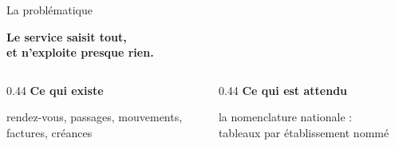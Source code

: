 \documentclass[aspectratio=169,11pt]{beamer}
\begin{document}
\begin{frame}{La problématique}
  \vspace{8mm}
  \begin{center}
    \begin{minipage}{0.84\textwidth}
      \centering
      {\Large\color{accentgarde}\textbf{Le service saisit tout,\\[1mm] et n'exploite presque rien.}\par}
    \end{minipage}
  \end{center}
  \vspace{8mm}
  \begin{columns}[T]
    \begin{column}{0.44\textwidth}
      \centering
      \textbf{Ce qui existe}\par\medskip
      rendez-vous, passages, mouvements,\\ factures, créances
    \end{column}
    \begin{column}{0.44\textwidth}
      \centering
      \textbf{Ce qui est attendu}\par\medskip
      la nomenclature nationale :\\
       tableaux par établissement nommé
    \end{column}
  \end{columns}
  \vspace{8mm}
  \begin{center}
  \end{center}
\end{frame}
\end{document}
